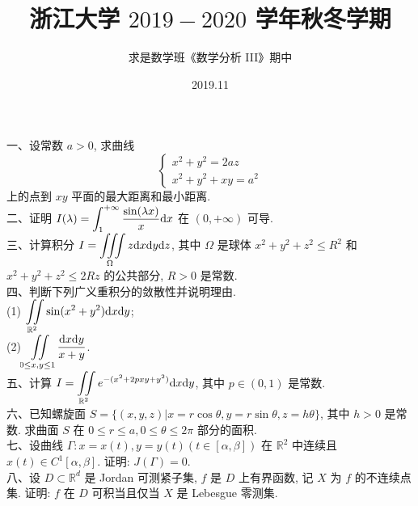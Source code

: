 \documentclass[UTF8]{ctexart}
\title{\textbf{浙江大学 $2019 - 2020$ 学年秋冬学期}}
\author{求是数学班《数学分析 III》期中}
\date{2019.11}
\begin{document}
\maketitle
一、设常数 $a>0$, 求曲线
\[
\begin{cases}
x^2+y^2=2az \\
x^2+y^2+xy=a^2 
\end{cases}
\]
上的点到 $xy$ 平面的最大距离和最小距离.
\\

二、证明 $\displaystyle I(\lambda)=\int_{1}^{+\infty}\frac{\sin(\lambda x)}{x}{\rm d}x$ 在 $(0,+\infty)$ 可导.
\\

三、计算积分 $\displaystyle I=\iiint\limits_{\Omega}z{\rm d}x{\rm d}y{\rm d}z$, 其中 $\Omega$ 是球体 $x^2+y^2+z^2\leq R^2$ 和 $x^2+y^2+z^2\leq2Rz$ 的公共部分, $R>0$ 是常数.
\\

四、判断下列广义重积分的敛散性并说明理由.
\\

(1) $\displaystyle\iint\limits_{\mathbb{R}^2}\sin(x^2+y^2){\rm d}x{\rm d}y$;
\\

(2) $\displaystyle\iint\limits_{0\leq x,y\leq1}\frac{{\rm d}x{\rm d}y}{x+y}$.
\\

五、计算 $\displaystyle I=\iint\limits_{\mathbb{R}^2}e^{-(x^2+2pxy+y^2)}{\rm d}x{\rm d}y$, 其中 $p\in(0,1)$ 是常数.
\\

六、已知螺旋面 $S=\{(x,y,z)|x=r\cos\theta, y=r\sin\theta, z=h\theta\}$, 其中 $h>0$ 是常数. 求曲面 $S$ 在 $0\leq r\leq a,0\leq\theta\leq2\pi$ 部分的面积.
\\

七、设曲线 $\Gamma:x=x(t),y=y(t)(t\in[\alpha,\beta])$ 在 $\mathbb{R}^2$ 中连续且 $x(t)\in C^1[\alpha,\beta]$. 证明: $J(\Gamma)=0$.
\\

八、设 $D\subset\mathbb{R}^d$ 是 Jordan 可测紧子集, $f$ 是 $D$ 上有界函数, 记 $X$ 为 $f$ 的不连续点集. 证明: $f$ 在 $D$ 可积当且仅当 $X$ 是 Lebesgue 零测集.
\end{document}
